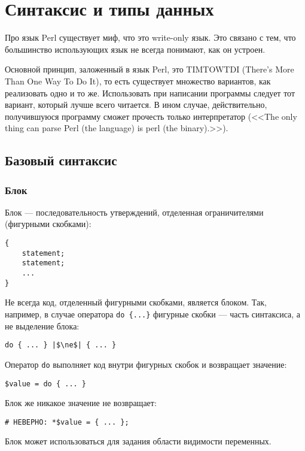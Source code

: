 \setcounter{chapter}{1}
\chapter{Синтаксис и типы данных}
Про язык Perl существует миф, что это write-only язык. Это связано с тем, что большинство использующих язык не всегда понимают, как он устроен.

Основной принцип, заложенный в язык Perl, это TIMTOWTDI (There's More Than One Way To Do It), то есть существует множество вариантов, как реализовать одно и то же. Использовать при написании программы следует тот вариант, который лучше всего читается. В ином случае, действительно, получившуюся программу сможет прочесть только интерпретатор (<<The only thing can parse Perl (the language) is perl (the binary).>>).

\section{Базовый синтаксис}
\subsection{Блок}
Блок --- последовательность утверждений, отделенная ограничителями (фигурными скобками):
\begin{verbatim}
{
	statement;
	statement;
	...
}
\end{verbatim}

Не всегда код, отделенный фигурными скобками, является блоком. Так, например, в случае оператора \verb|do {...}| фигурные скобки --- часть синтаксиса, а не выделение блока:
\begin{verbatim}
do { ... } |$\ne$| { ... }
\end{verbatim}
Оператор \verb|do| выполняет код внутри фигурных скобок и возвращает значение:
\begin{verbatim}
$value = do { ... }
\end{verbatim}
Блок же никакое значение не возвращает:
\begin{verbatim}
# НЕВЕРНО: *$value = { ... };
\end{verbatim}
Блок может использоваться для задания области видимости переменных.

